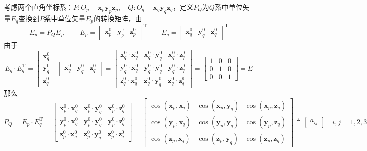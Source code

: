 考虑两个直角坐标系：$P:O_p-\bm{x}_p\bm{y}_p\bm{z}_p,\quad Q:O_q-\bm{x}_q\bm{y}_q\bm{z}_q$，定义$P_Q$为$Q$系中单位矢量$E_q$变换到$P$系中单位矢量$E_p$的转换矩阵，由
\begin{equation}
	E_p = P_QE_q, \qquad E_p =
	\begin{bmatrix}
		\bm{x}_p^0 & \bm{y}_p^0 & \bm{z}_p^0
	\end{bmatrix}^{\text{T}}
\qquad 
	E_q = 
	\begin{bmatrix}
		\bm{x}_q^0 & \bm{y}_q^0 & \bm{z}_q^0
	\end{bmatrix}^{\text{T}}
\end{equation}
由于
\begin{equation*}
	E_q \cdot E_q^{\text{T}} = 
	\begin{bmatrix}
		\bm{x}_q^0\\
		\bm{y}_q^0\\
		\bm{z}_q^0
	\end{bmatrix}
	\begin{bmatrix}
	\bm{x}_q^0 & \bm{y}_q^0 & \bm{z}_q^0
	\end{bmatrix}
	=
	\begin{bmatrix}
		\bm{x}_q^0 \cdot \bm{x}_q^0 & \bm{x}_q^0 \cdot \bm{y}_q^0 & \bm{x}_q^0 \cdot \bm{z}_q^0 \\ 
		\bm{y}_q^0 \cdot \bm{x}_q^0 & \bm{y}_q^0 \cdot \bm{y}_q^0 & \bm{y}_q^0 \cdot \bm{z}_q^0 \\ 
		\bm{z}_q^0 \cdot \bm{x}_q^0 & \bm{z}_q^0 \cdot \bm{y}_q^0 & \bm{z}_q^0 \cdot \bm{z}_q^0 
	\end{bmatrix}
	=
	\begin{bmatrix}
		1 & 0 & 0 \\
		0 & 1 & 0 \\
		0 & 0 & 1
	\end{bmatrix} = E
\end{equation*}
那么
\begin{equation}
	P_Q = E_p \cdot E_q^{\text{T}} = 
	\begin{bmatrix}
		\bm{x}_p^0 \cdot \bm{x}_q^0 & \bm{x}_p^0 \cdot \bm{y}_q^0 & \bm{x}_p^0 \cdot \bm{z}_q^0 \\ 
		\bm{y}_p^0 \cdot \bm{x}_q^0 & \bm{y}_p^0 \cdot \bm{y}_q^0 & \bm{y}_p^0 \cdot \bm{z}_q^0 \\ 
		\bm{z}_p^0 \cdot \bm{x}_q^0 & \bm{z}_p^0 \cdot \bm{y}_q^0 & \bm{z}_p^0 \cdot \bm{z}_q^0 
	\end{bmatrix}
	=
	\begin{bmatrix}
		\cos(\bm{x}_p, \bm{x}_q) & \cos(\bm{x}_p, \bm{y}_q) & \cos(\bm{x}_p, \bm{z}_q)\\
		\cos(\bm{y}_p, \bm{x}_q) & \cos(\bm{y}_p, \bm{y}_q) & \cos(\bm{y}_p, \bm{z}_q)\\
		\cos(\bm{z}_p, \bm{x}_q) & \cos(\bm{z}_p, \bm{y}_q) & \cos(\bm{z}_p, \bm{z}_q)
	\end{bmatrix}
	\triangleq
	\begin{bmatrix}
		a_{ij}
	\end{bmatrix}
	\quad i,j=1,2,3
	\label{方向余弦阵}
\end{equation}

